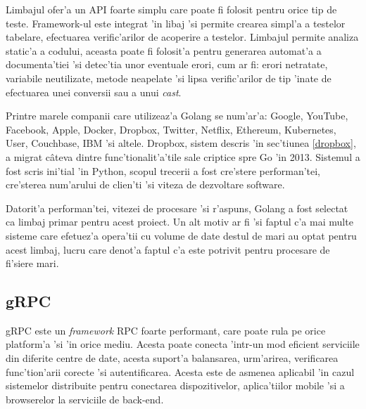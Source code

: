 \documentclass[12pt,a4paper,twoside]{report}
\begin{document}
Limbajul ofer'a un API foarte simplu care poate fi folosit pentru orice tip de teste. Framework-ul este integrat 'in libaj 'si permite crearea simpl'a a testelor tabelare, efectuarea verific'arilor de acoperire a testelor. Limbajul permite analiza static'a a codului, aceasta poate fi folosit'a pentru generarea automat'a a documenta'tiei 'si detec'tia unor eventuale erori, cum ar fi: erori netratate, variabile neutilizate, metode neapelate 'si lipsa verific'arilor de tip 'inate de efectuarea unei conversii sau a unui \textit{cast}.

Printre marele companii care utilizeaz'a Golang se num'ar'a: Google, YouTube, Facebook, Apple, Docker, Dropbox, Twitter, Netflix, Ethereum, Kubernetes, User, Couchbase, IBM 'si altele.
Dropbox, sistem descris 'in sec'tiunea \ref{dropbox}, a migrat câteva dintre func'tionalit'a'tile sale criptice spre Go 'in 2013. Sistemul a fost scris ini'tial 'in Python, scopul trecerii a fost cre'stere performan'tei, cre'sterea num'arului de clien'ti 'si viteza de dezvoltare software.

Datorit'a performan'tei, vitezei de procesare 'si r'aspuns, Golang a fost selectat ca limbaj primar pentru acest proiect. Un alt motiv ar fi 'si faptul c'a mai multe sisteme care efetuez'a opera'tii cu volume de date destul de mari au optat pentru acest limbaj, lucru care denot'a faptul c'a este potrivit pentru procesare de fi'siere mari.
\subsection{gRPC}
gRPC este un \textit{framework} RPC foarte performant, care poate rula pe orice platform'a 'si 'in orice mediu. Acesta poate conecta 'intr-un mod eficient serviciile din diferite centre de date, acesta suport'a balansarea, urm'arirea, verificarea func'tion'arii corecte 'si autentificarea. Acesta este de asmenea aplicabil 'in cazul sistemelor distribuite pentru conectarea dispozitivelor, aplica'tiilor mobile 'si a browserelor la serviciile de back-end.
\end{document}
